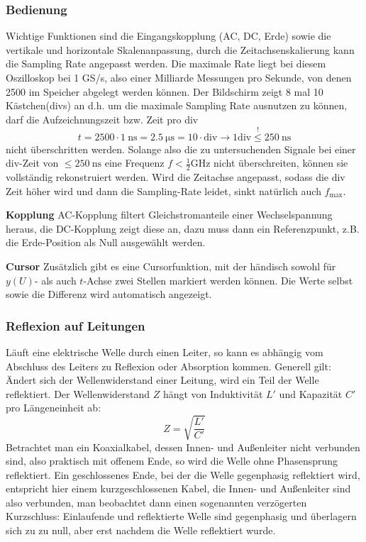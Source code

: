 \subsubsection{Bedienung}
Wichtige Funktionen sind die Eingangskopplung (AC, DC, Erde) sowie die vertikale und horizontale Skalenanpassung, durch die Zeitachsenskalierung kann die Sampling Rate angepasst werden. Die maximale Rate liegt bei diesem Oszilloskop bei 1 GS/s, also einer Milliarde Messungen pro Sekunde, von denen 2500 im Speicher abgelegt werden können. Der Bildschirm zeigt 8 mal 10 Kästchen(divs) an d.h. um die maximale Sampling Rate ausnutzen zu können, darf die Aufzeichnungszeit bzw. Zeit pro div
\begin{equation}
    t=2500\cdot\qty{1}{\nano\s}=\qty{2.5}{\micro\s}=10\cdot\text{div}\rightarrow 1\text{div}\overset{!}{\leq}\qty{250}{\nano\s} 
\end{equation}
nicht überschritten werden. Solange also die zu untersuchenden Signale bei einer div-Zeit von \(\leq\qty{250}{\nano\s}\) eine Frequenz \(f<\frac{1}{2}\unit{\giga\hertz}\) nicht überschreiten, können sie vollständig rekonstruiert werden. Wird die Zeitachse angepasst, sodass die div Zeit höher wird und dann die Sampling-Rate leidet, sinkt natürlich auch \(f_\text{max}\).

\textbf{Kopplung}
AC-Kopplung filtert Gleichstromanteile einer Wechselspannung heraus, die DC-Kopplung zeigt diese an, dazu muss dann ein Referenzpunkt, z.B. die Erde-Position als Null ausgewählt werden.

\textbf{Cursor}
Zusätzlich gibt es eine Cursorfunktion, mit der händisch sowohl für \(y(U)\)- als auch \(t\)-Achse zwei Stellen markiert werden können. Die Werte selbst sowie die Differenz wird automatisch angezeigt.
\subsubsection{Reflexion auf Leitungen}
Läuft eine elektrische Welle durch einen Leiter, so kann es abhängig vom Abschluss des Leiters zu Reflexion oder Absorption kommen. Generell gilt: Ändert sich der Wellenwiderstand einer Leitung, wird ein Teil der Welle reflektiert. Der Wellenwiderstand \(Z\) hängt von Induktivität \(L'\) und Kapazität \(C'\) pro Längeneinheit ab:
\begin{equation}
Z = \sqrt{\frac{L'}{C'}}
\end{equation}
Betrachtet man ein Koaxialkabel, dessen Innen- und Außenleiter nicht verbunden sind, also praktisch mit offenem Ende, so wird die Welle ohne Phasensprung reflektiert. Ein geschlossenes Ende, bei der die Welle gegenphasig reflektiert wird, entspricht hier einem kurzgeschlossenen Kabel, die Innen- und Außenleiter sind also verbunden, man beobachtet dann einen sogenannten verzögerten Kurzschluss: Einlaufende und reflektierte Welle sind gegenphasig und überlagern sich zu zu null, aber erst nachdem die Welle reflektiert wurde.

